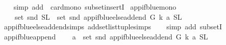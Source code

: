 \begin{isabellebody}
\ \ \isamarkupfalse%
\ {\isacharparenleft}{\kern0pt}simp\ add{\isacharcolon}{\kern0pt}\ \ card{\isacharunderscore}{\kern0pt}mono\ subset{\isacharunderscore}{\kern0pt}insertI{\isacharparenright}{\kern0pt}%
\endisatagproof
{\isafoldproof}%
%
\isadelimproof
\isanewline
%
\endisadelimproof
\isanewline
{}\isamarkupfalse%
\ app{\isacharunderscore}{\kern0pt}if{\isacharunderscore}{\kern0pt}blue{\isacharunderscore}{\kern0pt}mono{}{\isacharcolon}{\kern0pt}\isanewline
\ \ \ \ {\isachardoublequoteopen}set\ {\isacharparenleft}{\kern0pt}snd\ {\isacharparenleft}{\kern0pt}S{\isacharcomma}{\kern0pt}L{\isacharparenright}{\kern0pt}{\isacharparenright}{\kern0pt}\ {\isasymsubseteq}\ set\ {\isacharparenleft}{\kern0pt}snd\ {\isacharparenleft}{\kern0pt}app{\isacharunderscore}{\kern0pt}if{\isacharunderscore}{\kern0pt}blue{\isacharunderscore}{\kern0pt}else{\isacharunderscore}{\kern0pt}add{\isacharunderscore}{\kern0pt}end\ G\ k\ a\ {\isacharparenleft}{\kern0pt}S{\isacharcomma}{\kern0pt}L{\isacharparenright}{\kern0pt}\ {\isacharparenright}{\kern0pt}{\isacharparenright}{\kern0pt}{\isachardoublequoteclose}\isanewline
%
\isadelimproof
\ \ %
\endisadelimproof
%
\isatagproof
{}\isamarkupfalse%
\ app{\isacharunderscore}{\kern0pt}if{\isacharunderscore}{\kern0pt}blue{\isacharunderscore}{\kern0pt}else{\isacharunderscore}{\kern0pt}add{\isacharunderscore}{\kern0pt}end{\isachardot}{\kern0pt}simps\ add{\isacharunderscore}{\kern0pt}set{\isacharunderscore}{\kern0pt}list{\isacharunderscore}{\kern0pt}tuple{\isachardot}{\kern0pt}simps\isanewline
\ \ \isamarkupfalse%
\ {\isacharparenleft}{\kern0pt}simp\ add{\isacharcolon}{\kern0pt}\ subsetI{\isacharparenright}{\kern0pt}%
\endisatagproof
{\isafoldproof}%
%
\isadelimproof
\isanewline
%
\endisadelimproof
\isanewline
\isanewline
{}\isamarkupfalse%
\ app{\isacharunderscore}{\kern0pt}if{\isacharunderscore}{\kern0pt}blue{\isacharunderscore}{\kern0pt}append{\isacharcolon}{\kern0pt}\isanewline
\ \ \ \ {\isachardoublequoteopen}a\ {\isasymin}\ set\ {\isacharparenleft}{\kern0pt}snd\ {\isacharparenleft}{\kern0pt}app{\isacharunderscore}{\kern0pt}if{\isacharunderscore}{\kern0pt}blue{\isacharunderscore}{\kern0pt}else{\isacharunderscore}{\kern0pt}add{\isacharunderscore}{\kern0pt}end\ G\ k\ a\ {\isacharparenleft}{\kern0pt}S{\isacharcomma}{\kern0pt}L{\isacharparenright}{\kern0pt}\ {\isacharparenright}{\kern0pt}{\isacharparenright}{\kern0pt}{\isachardoublequoteclose}\isanewline
%
\isadelimproof
\ \ %
\endisadelimproof
%
\isatagproof
{}\isamarkupfalse%

\end{isabellebody}

